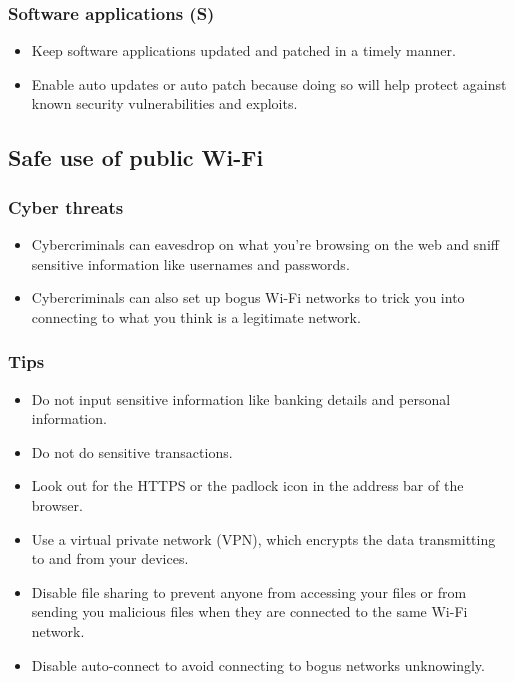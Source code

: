 \documentclass[11pt]{article}
\begin{document}
\subsubsection{Software applications (S)}
\label{sec:org940bb77}
\begin{itemize}
\item Keep software applications updated and patched in a timely manner.
\item Enable auto updates or auto patch because doing so will help protect against known security vulnerabilities and exploits.
\end{itemize}

\clearpage
\subsection{Safe use of public Wi-Fi}
\label{sec:org9a63b79}

\subsubsection{Cyber threats}
\label{sec:org185286b}
\begin{itemize}
\item Cybercriminals can eavesdrop on what you're browsing on the web and sniff sensitive information like usernames and passwords.
\item Cybercriminals can also set up bogus Wi-Fi networks to trick you into connecting to what you think is a legitimate network.
\end{itemize}
\subsubsection{Tips}
\label{sec:orga2e9b82}
\begin{itemize}
\item Do not input sensitive information like banking details and personal information.
\item Do not do sensitive transactions.
\item Look out for the HTTPS or the padlock icon in the address bar of the browser.
\item Use a virtual private network (VPN), which encrypts the data transmitting to and from your devices.
\item Disable file sharing to prevent anyone from accessing your files or from sending you malicious files when they are connected to the same Wi-Fi network.
\item Disable auto-connect to avoid connecting to bogus networks unknowingly.
\end{itemize}
\end{document}
